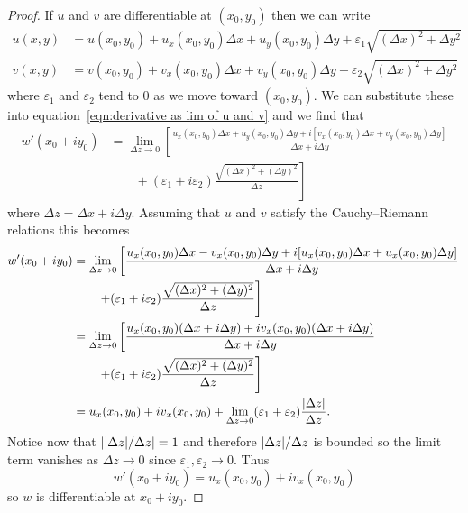 \documentclass{article}
\begin{document}
    \begin{proof}
        If \(u\) and \(v\) are differentiable at \((x_0, y_0)\) then we can write
        \begin{align*}
            u(x, y) &= u(x_0, y_0) + u_x(x_0, y_0)\Delta x + u_y(x_0, y_0)\Delta y + \varepsilon_1\sqrt{(\Delta x)^2 + \Delta y^2}\\
            v(x, y) &= v(x_0, y_0) + v_x(x_0, y_0)\Delta x + v_y(x_0, y_0)\Delta y + \varepsilon_2\sqrt{(\Delta x)^2 + \Delta y^2}
        \end{align*}
        where \(\varepsilon_1\) and \(\varepsilon_2\) tend to 0 as we move toward \((x_0, y_0)\).
        We can substitute these into equation~\ref{eqn:derivative as lim of u and v} and we find that
        \begin{align*}
            w'(x_0 + iy_0) &= \lim_{\Delta z\to 0} \left[ \frac{u_x(x_0, y_0)\Delta x + u_y(x_0, y_0)\Delta y + i[v_x(x_0, y_0)\Delta x + v_y(x_0, y_0)\Delta y]}{\Delta x + i\Delta y} \right.\\
            &\left. \qquad + (\varepsilon_1 + i\varepsilon_2)\frac{\sqrt{(\Delta x)^2 + (\Delta y)^2}}{\Delta z}\right]
        \end{align*}
        where \(\Delta z = \Delta x + i\Delta y\).
        Assuming that \(u\) and \(v\) satisfy the Cauchy--Riemann relations this becomes
        \begin{align*}
            w'(x_0 + iy_0) &= \lim_{\Delta z\to 0} \left[ \frac{u_x(x_0, y_0)\Delta x - v_x(x_0, y_0)\Delta y + i[u_x(x_0, y_0)\Delta x + u_x(x_0, y_0)\Delta y]}{\Delta x + i\Delta y} \right.\\
            &\left. \qquad + (\varepsilon_1 + i\varepsilon_2)\frac{\sqrt{(\Delta x)^2 + (\Delta y)^2}}{\Delta z}\right]\\
            &= \lim_{\Delta z\to 0} \left[ \frac{u_x(x_0, y_0)(\Delta x + i\Delta y) + iv_x(x_0, y_0)(\Delta x + i\Delta y)}{\Delta x + i\Delta y} \right.\\
            &\left. \qquad + (\varepsilon_1 + i\varepsilon_2)\frac{\sqrt{(\Delta x)^2 + (\Delta y)^2}}{\Delta z}\right]\\
            &= u_x(x_0, y_0) + iv_x(x_0, y_0) + \lim_{\Delta z \to 0}(\varepsilon_1 + \varepsilon_2)\frac{\abs{\Delta z}}{\Delta z}.
        \end{align*}
        Notice now that \(\abs{\abs{\Delta z}/\Delta z} = 1\) and therefore \(\abs{\Delta z}/\Delta z\) is bounded so the limit term vanishes as \(\Delta z \to 0\) since \(\varepsilon_1, \varepsilon_2\to 0\).
        Thus
        \[w'(x_0 + iy_0) = u_x(x_0, y_0) + iv_x(x_0, y_0)\]
        so \(w\) is differentiable at \(x_0 + iy_0\).
    \end{proof}
\end{document}
